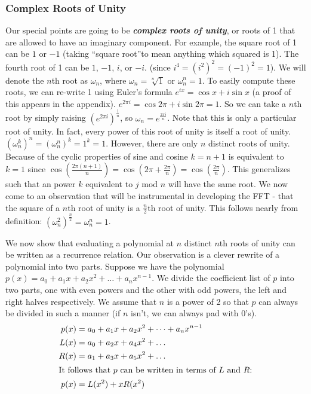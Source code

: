 \documentclass[11pt, oneside]{article}
\newcommand{\emphasis}[1]{\textbf{\textit{#1}}}
\theoremstyle{plain}
\theoremstyle{definition}
\begin{document}
\subsubsection{Complex Roots of Unity}
Our special points are going to be \emphasis{complex roots of unity},
or roots of 1 that are allowed to have an imaginary component.
For example, the square root of 1 can be \( 1 \) or \( -1 \)
(taking \enquote{square root}to mean anything which squared is 1).
The fourth root of 1 can be \( 1 \), \( -1 \), \( i \), or \( -i \).
(since \( i^4 = (i^2)^2 = (-1)^2 = 1 \)). We will denote the \( n \)th root as 
\( \omega_n \), where \( \omega_n = \sqrt[n]{1} \) or \( \omega^n_n = 1 \).
To easily compute these roots, we can re-write 1 using Euler's formula
\( e^{ix} = \cos x + i \sin x \) (a proof of this appears in the appendix).
\( e^{2 \pi i} = \cos 2 \pi + i \sin 2 \pi = 1 \).
So we can take a \( n \)th root by simply raising
\( (e^{2 \pi i})^{\frac{1}{n}} \), so \( \omega_n = e^{\frac{2 \pi i}{n}} \).
Note that this is only a particular root of unity.
In fact, every power of this root of unity is itself a root of unity.
\( (\omega^k_n)^n = (\omega^n_n)^k = 1^k = 1 \).
However, there are only \( n \) distinct roots of unity.
Because of the cyclic properties of sine and cosine \( k = n + 1 \)
is equivalent to \( k = 1 \) since \( \cos(\frac{2 \pi(n + 1)}{n}) =
\cos(2 \pi + \frac{2 \pi}{n}) = \cos(\frac{2 \pi}{n}) \).
This generalizes such that an power \( k \) equivalent to \( j \) mod \( n \)
will have the same root.
We now come to an observation that will be instrumental in developing
the FFT - that the square of a \( n \)th root of unity is a \( \frac{n}{2} \)th
root of unity. This follows nearly from definition:
\( (\omega_n^2)^{\frac{n}{2}} = \omega^n_n = 1 \).

We now show that evaluating a polynomial at \( n \) distinct \( n \)th roots of
unity can be written as a recurrence relation. Our observation is a clever
rewrite of a polynomial into two parts. Suppose we have the polynomial
\( p(x) = a_0 + a_1 x + a_2 x^2 + \dots + a_n x^{n - 1} \). We divide the
coefficient list of \( p \) into two parts,
one with even powers and the other with odd powers,
the left and right halves respectively.
We assume that \( n \) is a power of 2 so that \( p \) can always be divided
in such a manner (if \( n \) isn't, we can always pad with 0's).
\begin{align}
  p(x) &= a_0 + a_1 x + a_2 x^2 + \dots + a_n x^{n - 1} \\
  L(x) &= a_0 + a_2 x + a_4 x^2 + \dots \\
  R(x) &= a_1 + a_3 x + a_5 x^2 + \dots \\
  \shortintertext{It follows that \( p \) can be written
  in terms of \( L \) and \( R \):}
  p(x) &= L(x^2) + x R(x^2) \label{eq:recurrence} 
\end{align}
\end{document}
